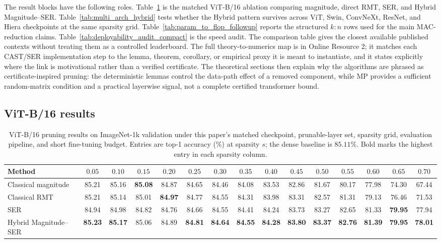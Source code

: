 \documentclass[11pt]{article}
\theoremstyle{plain}
\theoremstyle{definition}
\theoremstyle{remark}
\newcommand{\1}{\mathbf{1}}
\begin{document}
The result blocks have the following roles.  Table~\ref{tab:vitb_current_methods} is the matched ViT-B/16 ablation comparing magnitude, direct RMT, SER, and Hybrid Magnitude--SER.  Table~\ref{tab:multi_arch_hybrid} tests whether the Hybrid pattern survives across ViT, Swin, ConvNeXt, ResNet, and Hiera checkpoints at the same sparsity grid.  Table~\ref{tab:param_to_flop_followup} reports the structured \(k{:}n\) rows used for the main MAC-reduction claims.  Table~\ref{tab:deployability_audit_compact} is the speed audit.  The comparison table gives the closest available published contexts without treating them as a controlled leaderboard.  The full theory-to-numerics map is in Online Resource 2; it matches each CAST/SER implementation step to the lemma, theorem, corollary, or empirical proxy it is meant to instantiate, and it states explicitly where the link is motivational rather than a verified certificate.  The theoretical sections then explain why the algorithms are phrased as certificate-inspired pruning: the deterministic lemmas control the data-path effect of a removed component, while MP provides a sufficient random-matrix condition and a practical layerwise signal, not a complete certified transformer bound.

\subsection{ViT-B/16 results}
\label{subsec:vitb_current_results}

\begin{table}[!htbp]
\centering
\caption{ViT-B/16 pruning results on ImageNet-1k validation under this paper's matched checkpoint, prunable-layer set, sparsity grid, evaluation pipeline, and short fine-tuning budget. Entries are top-1 accuracy (\%) at sparsity \(s\); the dense baseline is \(85.11\%\). Bold marks the highest entry in each sparsity column.}
\label{tab:vitb_current_methods}
\scriptsize
\setlength{\tabcolsep}{2.5pt}
\begin{tabular}{lcccccccccccccc}
\toprule
Method & \(0.05\) & \(0.10\) & \(0.15\) & \(0.20\) & \(0.25\) & \(0.30\) & \(0.35\) & \(0.40\) & \(0.45\) & \(0.50\) & \(0.55\) & \(0.60\) & \(0.65\) & \(0.70\) \\
\midrule
Classical magnitude   & 85.21 & 85.16 & \textbf{85.08} & 84.87 & 84.65 & 84.46 & 84.08 & 83.53 & 82.86 & 81.67 & 80.17 & 77.98 & 74.30 & 67.44 \\
Classical RMT         & 85.21 & 85.14 & 85.01 & \textbf{84.97} & 84.77 & 84.55 & 84.31 & 83.98 & 83.31 & 82.57 & 81.31 & 79.13 & 76.46 & 71.53 \\
SER                   & 84.94 & 84.98 & 84.82 & 84.76 & 84.66 & 84.55 & 84.41 & 84.24 & 83.73 & 83.27 & 82.65 & 81.33 & \textbf{79.95} & 77.94 \\
Hybrid Magnitude--SER & \textbf{85.23} & \textbf{85.17} & 85.06 & 84.89 & \textbf{84.81} & \textbf{84.64} & \textbf{84.55} & \textbf{84.28} & \textbf{83.80} & \textbf{83.37} & \textbf{82.76} & \textbf{81.39} & \textbf{79.95} & \textbf{78.01} \\
\bottomrule
\end{tabular}
\end{table}
\end{document}
